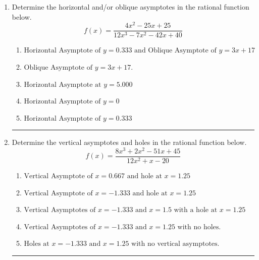 \documentclass[14pt]{extbook}
\newcommand{\litem}[1]{\item#1\hspace*{-1cm}\rule{\textwidth}{0.4pt}}
\begin{document}
\begin{enumerate}
\litem{
Determine the horizontal and/or oblique asymptotes in the rational function below.\[ f(x) = \frac{4x^{2} -25 x + 25}{12x^{3} -7 x^{2} -42 x + 40} \]\begin{enumerate}[label=\Alph*.]
\item \( \text{Horizontal Asymptote of } y = 0.333 \text{ and Oblique Asymptote of } y = 3x + 17 \)
\item \( \text{Oblique Asymptote of } y = 3x + 17. \)
\item \( \text{Horizontal Asymptote at } y = 5.000 \)
\item \( \text{Horizontal Asymptote of } y = 0 \)
\item \( \text{Horizontal Asymptote of } y = 0.333  \)

\end{enumerate} }
\litem{
Determine the vertical asymptotes and holes in the rational function below.\[ f(x) = \frac{8x^{3} +2 x^{2} -51 x + 45}{12x^{2} +x -20} \]\begin{enumerate}[label=\Alph*.]
\item \( \text{Vertical Asymptote of } x = 0.667 \text{ and hole at } x = 1.25 \)
\item \( \text{Vertical Asymptote of } x = -1.333 \text{ and hole at } x = 1.25 \)
\item \( \text{Vertical Asymptotes of } x = -1.333 \text{ and } x = 1.5 \text{ with a hole at } x = 1.25 \)
\item \( \text{Vertical Asymptotes of } x = -1.333 \text{ and } x = 1.25 \text{ with no holes.} \)
\item \( \text{Holes at } x = -1.333 \text{ and } x = 1.25 \text{ with no vertical asymptotes.} \)


\end{enumerate}}
\end{enumerate}
\end{document}
